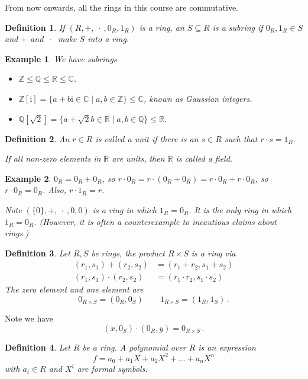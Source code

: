 \documentclass{article}
\theoremstyle{plain}\theoremheaderfont{\normalfont\itshape}\theorembodyfont{\rmfamily}\theoremseparator{.}\newtheorem*{rem}{Remark}\newtheorem*{ex}{Example}\newtheorem*{proof}{Proof}\newtheorem*{altp}{Alternative proof}\newtheorem*{nonex}{Non-Example}
\theoremstyle{plain}\theoremheaderfont{\normalfont\bfseries}\theorembodyfont{\rmfamily}\theoremseparator{.}\newtheorem{thm}{Theorem}[section]\newtheorem{lem}[thm]{Lemma}\newtheorem{prop}[thm]{Proposition}\newtheorem*{cor}{Corollary}\newtheorem{defn}[thm]{Definition}\newtheorem{clm}[thm]{Claim}\newtheorem{clminproof}{Claim}\newtheorem*{notn}{Notation}\newtheorem*{exer}{Exercise}\newtheorem*{lemnn}{Lemma}
\theoremstyle{break}\theoremheaderfont{\normalfont\itshape}\theorembodyfont{\rmfamily}\theoremseparator{.\medskip}\newtheorem*{proofskip}{Proof}\newtheorem*{exs}{Examples}\newtheorem*{rems}{Remarks}\newtheorem*{obs}{Observations}
\theoremstyle{break}\theoremheaderfont{\normalfont\bfseries}\theorembodyfont{\rmfamily}\theoremseparator{.\medskip}\newtheorem{lemskip}[thm]{Lemma}\newtheorem{defnskip}[thm]{Definition}\newtheorem{propskip}[thm]{Proposition}\newtheorem{thmskip}[thm]{Theorem}
\numberwithin{equation}{section}
\newcommand{\ii}{\mathrm{i}}
\newcommand{\ZZ}{\mathbb{Z}}
\newcommand{\QQ}{\mathbb{Q}}
\newcommand{\RR}{\mathbb{R}}
\newcommand{\CC}{\mathbb{C}}
\begin{document}
    From now onwards, all the rings in this course are commutative.

    \begin{defn}
        If \((R,+,\ \cdot \ ,0_R,1_R)\) is a ring, an \(S\subseteq R\) is a \textit{subring} if \(0_R,1_R\in S\) and \(+\) and \(\ \cdot\ \) make \(S\) into a ring.
    \end{defn}
    \begin{ex}
        We have subrings
        \begin{itemize}[topsep=0pt]
            \item \(\ZZ\le\QQ\le\RR\le\CC\).
            \item \(\ZZ[\ii]=\{a+b\ii\in\CC\mid a,b\in\ZZ\}\le\CC\), known as \textit{Gaussian integers}.
            \item \(\QQ[\sqrt{2}]=\{a+\sqrt{2}b\in\RR\mid a,b\in\QQ\}\le\RR\).
        \end{itemize}
    \end{ex}
    \begin{defn}
        An \(r\in R\) is called a \textit{unit} if there is an \(s\in R\) such that \(r\cdot s=1_R\).

        If all non-zero elements in \(\RR\) are units, then \(\RR\) is called a \textit{field}.
    \end{defn}
    \begin{ex}
        \(0_R=0_R+0_R\), so \(r\cdot 0_R=r\cdot(0_R+0_R)=r\cdot 0_R+r\cdot 0_R\), so \(r\cdot 0_R=0_R\). Also, \(r\cdot 1_R=r\).

        Note \((\{0\},+,\ \cdot \ , 0, 0)\) is a ring in which \(1_R=0_R\). It is the only ring in which \(1_R=0_R\). (However, it is often a counterexample to incautious claims about rings.)
    \end{ex}
    \begin{defn}
        Let \(R,S\) be rings, the \textit{product} \(R\times S\) is a ring via
        \begin{align*}
            (r_1,s_1)+(r_2,s_2)&=(r_1+r_2,s_1+s_2)\\
            (r_1,s_1)\cdot(r_2,s_2)&=(r_1\cdot r_2,s_1\cdot s_2)
        \end{align*}
        The zero element and one element are
        \[0_{R\times S}=(0_R,0_S)\qquad 1_{R\times S}=(1_R,1_S)\,.\]
    \end{defn}
    Note we have
    \[(x,0_S)\cdot (0_R,y)=0_{R\times S}\,.\]
    \begin{defn}
        Let \(R\) be a ring. A \textit{polynomial} over \(R\) is an expression
        \[f=a_0+a_1X+a_2X^2+\dots+a_nX^n\]
        with \(a_i\in R\) and \(X^i\) are formal symbols.
    \end{defn}
\end{document}
